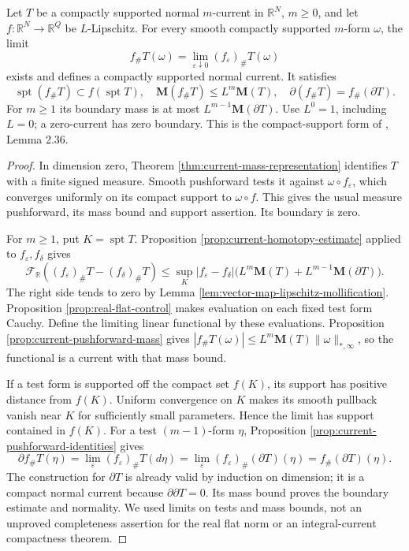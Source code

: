 \begin{theorem}\label{thm:compact-normal-lipschitz-pushforward}
Let $T$ be a compactly supported normal $m$-current in $\mathbb R^N$, $m\geq0$, and let $f:\mathbb R^N\to\mathbb R^Q$ be $L$-Lipschitz. For every smooth compactly supported $m$-form $\omega$, the limit
\[
 f_\#T(\omega)=\lim_{\varepsilon\downarrow0}(f_\varepsilon)_\#T(\omega)
\]
exists and defines a compactly supported normal current. It satisfies
\[
 \operatorname{spt}(f_\#T)\subset f(\operatorname{spt}T),
 \quad \mathbf M(f_\#T)\leq L^m\mathbf M(T),
 \quad \partial(f_\#T)=f_\#(\partial T).
\]
For $m\geq1$ its boundary mass is at most $L^{m-1}\mathbf M(\partial T)$. Use $L^0=1$, including $L=0$; a zero-current has zero boundary. This is the compact-support form of \cite{Sim18}, Lemma 2.36.
\end{theorem}
\begin{proof}
In dimension zero, Theorem \ref{thm:current-mass-representation} identifies $T$ with a finite signed measure. Smooth pushforward tests it against $\omega\circ f_\varepsilon$, which converges uniformly on its compact support to $\omega\circ f$. This gives the usual measure pushforward, its mass bound and support assertion. Its boundary is zero.

For $m\geq1$, put $K=\operatorname{spt}T$. Proposition \ref{prop:current-homotopy-estimate} applied to $f_\varepsilon,f_\delta$ gives
\[
 \mathcal F_{\mathbb R}((f_\varepsilon)_\#T-(f_\delta)_\#T)
 \leq \sup_K|f_\varepsilon-f_\delta|
       \bigl(L^m\mathbf M(T)+L^{m-1}\mathbf M(\partial T)\bigr).
\]
The right side tends to zero by Lemma \ref{lem:vector-map-lipschitz-mollification}. Proposition \ref{prop:real-flat-control} makes evaluation on each fixed test form Cauchy. Define the limiting linear functional by these evaluations. Proposition \ref{prop:current-pushforward-mass} gives $|f_\#T(\omega)|\leq L^m\mathbf M(T)\|\omega\|_{*,\infty}$, so the functional is a current with that mass bound.

If a test form is supported off the compact set $f(K)$, its support has positive distance from $f(K)$. Uniform convergence on $K$ makes its smooth pullback vanish near $K$ for sufficiently small parameters. Hence the limit has support contained in $f(K)$. For a test $(m-1)$-form $\eta$, Proposition \ref{prop:current-pushforward-identities} gives
\[
 \partial f_\#T(\eta)
 =\lim_\varepsilon (f_\varepsilon)_\#T(d\eta)
 =\lim_\varepsilon (f_\varepsilon)_\#(\partial T)(\eta)
 =f_\#(\partial T)(\eta).
\]
The construction for $\partial T$ is already valid by induction on dimension; it is a compact normal current because $\partial\partial T=0$. Its mass bound proves the boundary estimate and normality. We used limits on tests and mass bounds, not an unproved completeness assertion for the real flat norm or an integral-current compactness theorem.
\end{proof}

